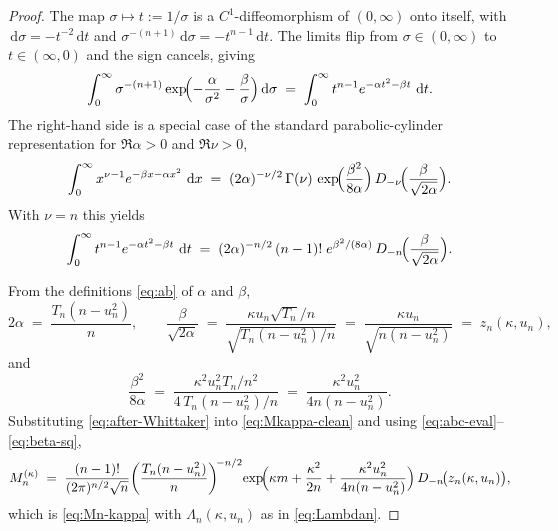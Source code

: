 \documentclass[12pt, a4paper]{report}
\newcommand{\dd}{\,\mathrm{d}}
\newcommand{\1}{\mathbf{1}}
\begin{document}
\begin{proof}
The map $\sigma\mapsto t:=1/\sigma$ is a $C^1$-diffeomorphism of
$(0,\infty)$ onto itself, with $\dd\sigma=-t^{-2}\dd t$ and
$\sigma^{-(n+1)}\dd\sigma=-t^{n-1}\dd t$. The limits flip from
$\sigma\in(0,\infty)$ to $t\in(\infty,0)$ and the sign cancels, giving
\begin{equation}\label{eq:Whittaker-input}
  \int_0^\infty\sigma^{-(n+1)}
  \exp\!\Bigl(-\frac{\alpha}{\sigma^2}-\frac{\beta}{\sigma}\Bigr)\dd\sigma
  \;=\;\int_0^\infty t^{n-1}e^{-\alpha t^2-\beta t}\,\dd t.
\end{equation}
The right-hand side is a special case of the standard
parabolic-cylinder representation for $\Re\alpha>0$ and $\Re\nu>0$,
\begin{equation}\label{eq:pcyl-int}
  \int_0^\infty x^{\nu-1}e^{-\beta x-\alpha x^2}\,\dd x
  \;=\;(2\alpha)^{-\nu/2}\,\Gamma(\nu)\,
  \exp\!\Bigl(\frac{\beta^2}{8\alpha}\Bigr)\,
  D_{-\nu}\!\Bigl(\frac{\beta}{\sqrt{2\alpha}}\Bigr).
\end{equation}
With $\nu=n$ this yields
\begin{equation}\label{eq:after-Whittaker}
  \int_0^\infty t^{n-1}e^{-\alpha t^2-\beta t}\,\dd t
  \;=\;(2\alpha)^{-n/2}\,(n-1)!\;
  e^{\beta^2/(8\alpha)}\,
  D_{-n}\!\Bigl(\frac{\beta}{\sqrt{2\alpha}}\Bigr).
\end{equation}

From the definitions \eqref{eq:ab} of $\alpha$ and $\beta$,
\begin{equation}\label{eq:abc-eval}
  2\alpha\;=\;\frac{T_n(n-u_n^2)}{n},\qquad
  \frac{\beta}{\sqrt{2\alpha}}
  \;=\;\frac{\kappa u_n\sqrt{T_n}/n}{\sqrt{T_n(n-u_n^2)/n}}
  \;=\;\frac{\kappa u_n}{\sqrt{n(n-u_n^2)}}
  \;=\;z_n(\kappa,u_n),
\end{equation}
and
\begin{equation}\label{eq:beta-sq}
  \frac{\beta^2}{8\alpha}
  \;=\;\frac{\kappa^2 u_n^2 T_n/n^2}{4\,T_n(n-u_n^2)/n}
  \;=\;\frac{\kappa^2 u_n^2}{4n(n-u_n^2)}.
\end{equation}
Substituting \eqref{eq:after-Whittaker} into \eqref{eq:Mkappa-clean}
and using \eqref{eq:abc-eval}--\eqref{eq:beta-sq},
\[
  M_n^{(\kappa)}
  \;=\;\frac{(n-1)!}{(2\pi)^{n/2}\sqrt n}
  \!\left(\frac{T_n(n-u_n^2)}{n}\right)^{\!-n/2}\!
  \exp\!\Bigl(\kappa m+\frac{\kappa^2}{2n}
  +\frac{\kappa^2 u_n^2}{4n(n-u_n^2)}\Bigr)\,
  D_{-n}\!\bigl(z_n(\kappa,u_n)\bigr),
\]
which is \eqref{eq:Mn-kappa} with $\Lambda_n(\kappa,u_n)$ as in
\eqref{eq:Lambdan}.


\end{proof}
\end{document}
